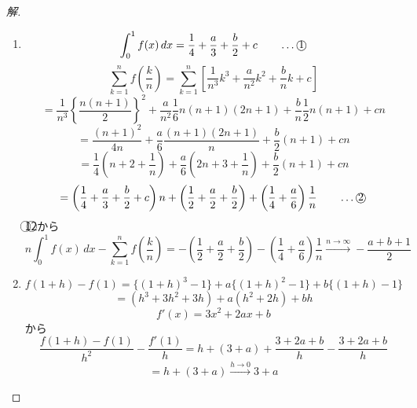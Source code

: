 \documentclass[../main.tex]{subfiles}
\begin{document}
\begin{proof}[解]
  \begin{enumerate}
    \item[(1)]
      \[
        \int_0^1 f(x) \, dx = \frac{1}{4} + \frac{a}{3} + \frac{b}{2} + c \qquad \dots \text{\textcircled{1}}
      \]
      \[
        \sum_{k=1}^n f\left(\frac{k}{n}\right) = \sum_{k=1}^n \left[ \frac{1}{n^3} k^3 + \frac{a}{n^2} k^2 + \frac{b}{n} k + c \right]
      \]
      \[
        = \frac{1}{n^3} \left\{ \frac{n(n+1)}{2} \right\}^2 + \frac{a}{n^2} \frac{1}{6} n(n+1)(2n+1) + \frac{b}{n} \frac{1}{2} n(n+1) + cn
      \]
      \[
        = \frac{(n+1)^2}{4n} + \frac{a}{6} \frac{(n+1)(2n+1)}{n} + \frac{b}{2}(n+1) + cn
      \]
      \[
        = \frac{1}{4}\left(n + 2 + \frac{1}{n}\right) + \frac{a}{6}\left(2n + 3 + \frac{1}{n}\right) + \frac{b}{2}(n+1) + cn
      \]
      \[
        = \left(\frac{1}{4} + \frac{a}{3} + \frac{b}{2} + c\right) n + \left(\frac{1}{2} + \frac{a}{2} + \frac{b}{2}\right) + \left(\frac{1}{4} + \frac{a}{6}\right) \frac{1}{n} \qquad \dots \text{\textcircled{2}}
      \]
      \textcircled{1}\textcircled{2}から
      \[
        n \int_0^1 f(x) \, dx - \sum_{k=1}^n f\left(\frac{k}{n}\right) = -\left(\frac{1}{2} + \frac{a}{2} + \frac{b}{2}\right) - \left(\frac{1}{4} + \frac{a}{6}\right) \frac{1}{n} \xrightarrow{n \to \infty} -\frac{a+b+1}{2}
      \]

    \item[(2)]
      \[
        f(1+h) - f(1) = \{(1+h)^3 - 1\} + a\{(1+h)^2 - 1\} + b\{(1+h) - 1\}
      \]
      \[
        = (h^3 + 3h^2 + 3h) + a(h^2 + 2h) + bh
      \]
      \[
        f'(x) = 3x^2 + 2ax + b
      \]
      から
      \[
        \frac{f(1+h) - f(1)}{h^2} - \frac{f'(1)}{h} = h + (3+a) + \frac{3+2a+b}{h} - \frac{3+2a+b}{h}
      \]
      \[
        = h + (3+a) \xrightarrow{h \to 0} 3+a
      \]
  \end{enumerate}
\end{proof}
\end{document}

